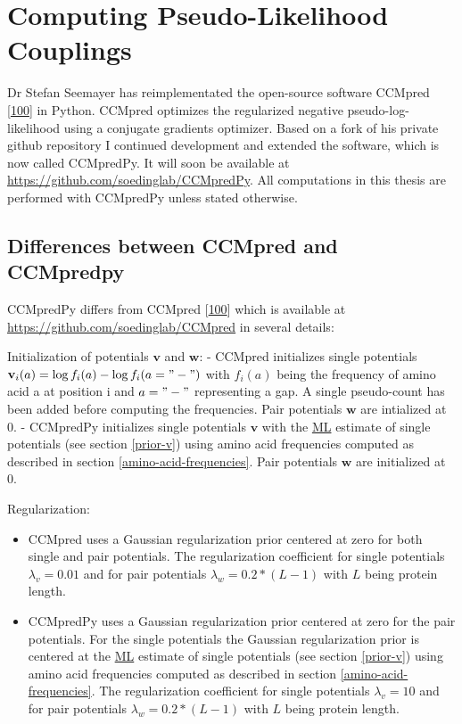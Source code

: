 \documentclass[11pt,a4paper,twoside]{book}
\providecommand{\tightlist}{%
  \setlength{\itemsep}{0pt}\setlength{\parskip}{0pt}}
\renewcommand{\v}{\mathbf{v}}
\newcommand{\w}{\mathbf{w}}
\theoremstyle{definition}
\theoremstyle{definition}
\theoremstyle{remark}
\begin{document}
\section{Computing Pseudo-Likelihood
Couplings}\label{computing-pseudo-likelihood-couplings}

Dr Stefan Seemayer has reimplementated the open-source software CCMpred
{[}\protect\hyperlink{ref-Seemayer2014}{100}{]} in Python. CCMpred
optimizes the regularized negative pseudo-log-likelihood using a
conjugate gradients optimizer. Based on a fork of his private github
repository I continued development and extended the software, which is
now called CCMpredPy. It will soon be available at
\url{https://github.com/soedinglab/CCMpredPy}. All computations in this
thesis are performed with CCMpredPy unless stated otherwise.

\subsection{Differences between CCMpred and
CCMpredpy}\label{diff-ccmpred-ccmpredpy}

CCMpredPy differs from CCMpred
{[}\protect\hyperlink{ref-Seemayer2014}{100}{]} which is available at
\url{https://github.com/soedinglab/CCMpred} in several details:

Initialization of potentials \(\v\) and \(\w\): - CCMpred initializes
single potentials \(\v_i(a) = \log f_i(a) - \log f_i(a= "-")\) with
\(f_i(a)\) being the frequency of amino acid a at position i and
\(a="-"\) representing a gap. A single pseudo-count has been added
before computing the frequencies. Pair potentials \(\w\) are intialized
at 0. - CCMpredPy initializes single potentials \(\v\) with the
\protect\hyperlink{abbrev}{ML} estimate of single potentials (see
section \ref{prior-v}) using amino acid frequencies computed as
described in section \ref{amino-acid-frequencies}. Pair potentials
\(\w\) are initialized at 0.

Regularization:

\begin{itemize}
\tightlist
\item
  CCMpred uses a Gaussian regularization prior centered at zero for both
  single and pair potentials. The regularization coefficient for single
  potentials \(\lambda_v = 0.01\) and for pair potentials
  \(\lambda_w = 0.2 * (L-1)\) with \(L\) being protein length.
\item
  CCMpredPy uses a Gaussian regularization prior centered at zero for
  the pair potentials. For the single potentials the Gaussian
  regularization prior is centered at the \protect\hyperlink{abbrev}{ML}
  estimate of single potentials (see section \ref{prior-v}) using amino
  acid frequencies computed as described in section
  \ref{amino-acid-frequencies}. The regularization coefficient for
  single potentials \(\lambda_v = 10\) and for pair potentials
  \(\lambda_w = 0.2 * (L-1)\) with \(L\) being protein length.
\end{itemize}
\end{document}
